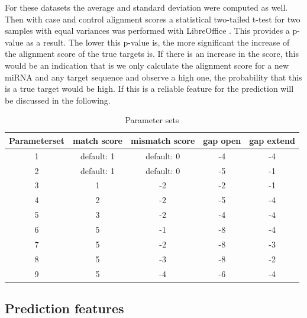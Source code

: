 \documentclass[12pt]{article}
\begin{document}
For these datasets the average and standard deviation were computed as well. Then with case and control alignment scores a statistical two-tailed t-test for two samples with equal variances was performed with LibreOffice \cite{ttest}. This provides a p-value as a result. The lower this p-value is, the more significant the increase of the alignment score of the true targets is. If there is an increase in the score, this would be an indication that is we only calculate the alignment score for a new miRNA and any target sequence and observe a high one, the probability that this is a true target would be high. If this is a reliable feature for the prediction will be discussed in the following.

\begin{table}
\caption{Parameter sets}
\vspace{0.3cm}
\begin{tabular}{c|c|c|c|c}
Parameterset & match score & mismatch score & gap open & gap extend\\
\hline\hline 
1 & default: 1 & default: 0 & -4 & -4\\
2 &  default: 1 & default: 0 & -5 & -1 \\
3 &  1 & -2 & -2 & -1 \\
4 &  2 & -2 & -5 & -4 \\
5 &  3 & -2 & -4 & -4 \\
6 &  5 & -1 & -8 & -4 \\
7 &  5 & -2 & -8 & -3 \\
8 &  5 & -3 & -8 & -2 \\
9 &  5 & -4 & -6 & -4 \\
\hline
\end{tabular}
\label{table:parameter}
\end{table}

\subsection{Prediction features}
\end{document}
